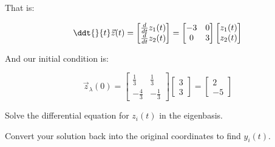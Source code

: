 \begin{enumerate}
{That is:

	$$\ddt{}{t} \vec{z}(t) = \begin{bmatrix}\frac{d}{dt} z_{1}(t) \\ \frac{d}{dt}z_{2}(t)\end{bmatrix} = \begin{bmatrix}-3 & 0 \\ 0 & 3\end{bmatrix}\begin{bmatrix}z_{1}(t) \\ z_{2}(t)\end{bmatrix}$$

And our initial condition is:

$$\vec z_{\lambda}(0) = \begin{bmatrix}\frac{1}{3} & \frac{1}{3} \\ -\frac{4}{3} & -\frac{1}{3}\end{bmatrix}\begin{bmatrix} 3 \\ 3 \end{bmatrix} = \begin{bmatrix} 2 \\ -5 \end{bmatrix} $$
}

\qitem Solve the differential equation for $z_{i}(t)$ in the eigenbasis.


\qitem Convert your solution back into the original coordinates to find $y_i(t)$.




\end{enumerate}
